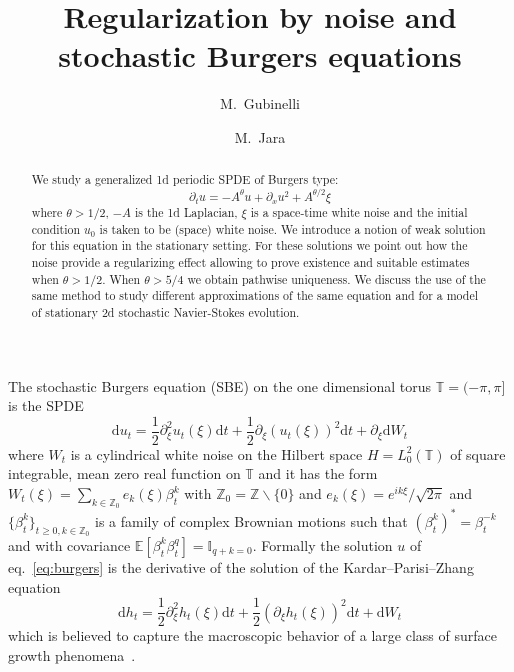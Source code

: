 \documentclass[11pt,a4paper,reqno]{amsart}
\newcommand{\TT}{\mathbb{T}}
\newcommand{\II}{\mathbb{I}}
\newcommand{\ZZ}{\mathbb{Z}}
\newcommand{\expect}{\mathbb{E}}
\newcommand{\dd}{\mathrm{d}}
\newcommand{\Lz}{{L^2_0(\TT)}}
\begin{document}
\title[Regularization for SBE]{Regularization by noise and \\  stochastic Burgers equations}
\author{M.~Gubinelli}
\address[M.~Gubinelli]{CEREMADE  UMR 7534 -- Universit\'e Paris--Dauphine}
\author{M.~Jara}
\address[M.~Jara]{IMPA\\
Estrada Dona Castorina 110\\
CEP 22460-320\\
Rio de Janeiro\\
Brazil}

\begin{abstract}
We study a generalized 1d periodic SPDE of Burgers type:
$$
\partial_t u =- A^\theta u  + \partial_x u^2  + A^{\theta/2} \xi 
$$
where $\theta > 1/2$, $-A$ is the 1d Laplacian,  $\xi$ is a space-time white noise and  the initial condition $u_0$ is taken to be (space) white noise. We introduce a notion of weak solution for this equation in the stationary setting. For these solutions we point out how the noise provide a regularizing effect allowing to prove existence and suitable estimates when $\theta>1/2$. When $\theta>5/4$ we obtain pathwise uniqueness. We discuss the use of the same method to study different approximations of the same equation and for a model of stationary 2d stochastic Navier-Stokes evolution. 
\end{abstract}

\maketitle

The stochastic Burgers equation (SBE) on the one dimensional torus $\TT=(-\pi,\pi]$ is the SPDE
\begin{equation}
\label{eq:burgers}
\dd u_t = \frac12 \partial_\xi^2 u_t(\xi) \dd t + \frac12 \partial_\xi (u_t(\xi))^2 \dd t + \partial_\xi \dd W_t 
\end{equation}
where $W_t$ is a cylindrical white noise on the Hilbert space $H=\Lz$ of square integrable, mean zero real function on $\TT$ and it has the form
$
W_t(\xi) = \sum_{k\in\ZZ_0} e_k(\xi) \beta^k_t
$
with $\ZZ_0 = \ZZ\backslash \{0\}$ and $e_k(\xi)=e^{i k\xi}/\sqrt{2\pi}$ and $\{\beta_t^k\}_{t\ge 0, k\in\ZZ_0}$ is a family of complex Brownian motions such that $(\beta^k_t)^*=\beta^{-k}_t$ and with covariance $\expect[\beta_t^k \beta_t^q ]=\II_{q+k=0}$.   Formally the solution $u$ of eq.~\eqref{eq:burgers} is the derivative of the solution  of the Kardar--Parisi--Zhang equation
\begin{equation}
\label{eq:kpz}
\dd h_t = \frac12 \partial_\xi^2 h_t(\xi) \dd t + \frac12  (\partial_\xi h_t(\xi))^2 \dd t +  \dd W_t 
\end{equation}
which is believed to capture the macroscopic behavior of a large class of surface growth phenomena~\cite{KPZ}.
\end{document}
